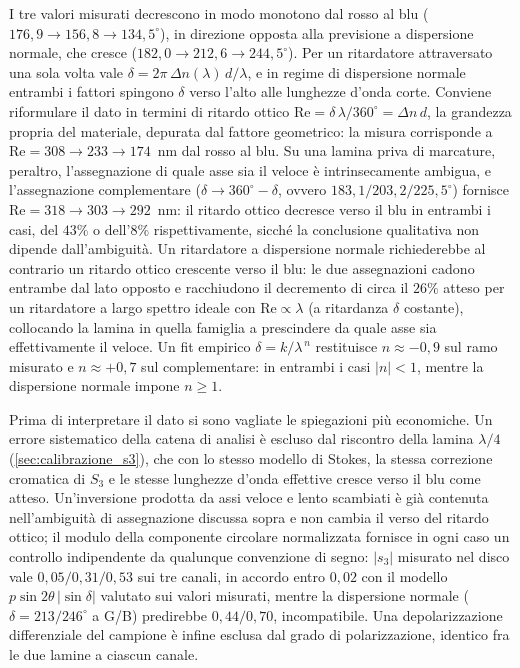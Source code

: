 I tre valori misurati decrescono in modo monotono dal rosso al blu ($176{,}9 \to 156{,}8 \to 134{,}5^\circ$), in direzione opposta alla previsione a dispersione normale, che cresce ($182{,}0 \to 212{,}6 \to 244{,}5^\circ$). Per un ritardatore attraversato una sola volta vale $\delta = 2\pi\,\Delta n(\lambda)\,d/\lambda$, e in regime di dispersione normale entrambi i fattori spingono $\delta$ verso l'alto alle lunghezze d'onda corte. Conviene riformulare il dato in termini di ritardo ottico $\mathrm{Re} = \delta\,\lambda/360^\circ = \Delta n\, d$, la grandezza propria del materiale, depurata dal fattore geometrico: la misura corrisponde a $\mathrm{Re} = 308 \to 233 \to 174$~nm dal rosso al blu. Su una lamina priva di marcature, peraltro, l'assegnazione di quale asse sia il veloce è intrinsecamente ambigua, e l'assegnazione complementare ($\delta \to 360^\circ - \delta$, ovvero $183{,}1/203{,}2/225{,}5^\circ$) fornisce $\mathrm{Re} = 318 \to 303 \to 292$~nm: il ritardo ottico decresce verso il blu in entrambi i casi, del $43\%$ o dell'$8\%$ rispettivamente, sicché la conclusione qualitativa non dipende dall'ambiguità. Un ritardatore a dispersione normale richiederebbe al contrario un ritardo ottico crescente verso il blu: le due assegnazioni cadono entrambe dal lato opposto e racchiudono il decremento di circa il $26\%$ atteso per un ritardatore a largo spettro ideale con $\mathrm{Re} \propto \lambda$ (a ritardanza $\delta$ costante), collocando la lamina in quella famiglia a prescindere da quale asse sia effettivamente il veloce. Un fit empirico $\delta = k/\lambda^{\,n}$ restituisce $n \approx -0{,}9$ sul ramo misurato e $n \approx +0{,}7$ sul complementare: in entrambi i casi $|n| < 1$, mentre la dispersione normale impone $n \geq 1$.

Prima di interpretare il dato si sono vagliate le spiegazioni più economiche. Un errore sistematico della catena di analisi è escluso dal riscontro della lamina $\lambda/4$ (\cref{sec:calibrazione_s3}), che con lo stesso modello di Stokes, la stessa correzione cromatica di $S_3$ e le stesse lunghezze d'onda effettive cresce verso il blu come atteso. Un'inversione prodotta da assi veloce e lento scambiati è già contenuta nell'ambiguità di assegnazione discussa sopra e non cambia il verso del ritardo ottico; il modulo della componente circolare normalizzata fornisce in ogni caso un controllo indipendente da qualunque convenzione di segno: $|s_3|$ misurato nel disco vale $0{,}05/0{,}31/0{,}53$ sui tre canali, in accordo entro $0{,}02$ con il modello $p \sin 2\theta\, |\sin\delta|$ valutato sui valori misurati, mentre la dispersione normale ($\delta = 213/246^\circ$ a G/B) predirebbe $0{,}44/0{,}70$, incompatibile. Una depolarizzazione differenziale del campione è infine esclusa dal grado di polarizzazione, identico fra le due lamine a ciascun canale.

